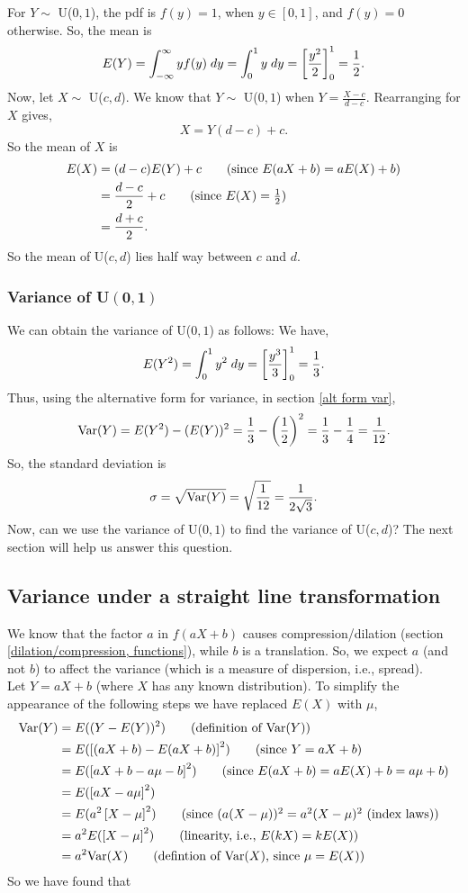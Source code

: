 \noindent For $Y \sim$ U($0,1$), the pdf is $f(y) = 1$, when $y \in [0,1]$, and $f(y) = 0$ otherwise. So, the mean is
\[
E(Y) = \int_{-\infty}^\infty yf(y) \; dy = \int_{0}^1 y \; dy = \left[\frac{y^2}{2}\right]^1_0 = \frac{1}{2}.
\]
\noindent Now, let $X \sim$ U($c,d$). We know that $Y \sim$ U($0,1$) when $Y = \frac{X-c}{d-c}$. Rearranging for $X$ gives,
\[
X = Y(d-c) + c.
\]
So the mean of $X$ is
\begin{align*}
E(X)  & = (d-c)E(Y) + c \tag{since $E(aX+b) = aE(X) + b$} \\
	& = \frac{d-c}{2} + c \tag{since $E(X) = \frac{1}{2}$} \\
	& = \frac{d+c}{2}.
\end{align*}
So the mean of U($c,d$) lies half way between $c$ and $d$. \\

\subsubsection{Variance of U$\boldsymbol{(0,1)}$} \label{variance of U(0,1)}

We can obtain the variance of U($0,1$) as follows: We have,
\[
E(Y^2) = \int_{0}^1 y^2 \; dy = \left[\frac{y^3}{3}\right]^1_0 = \frac{1}{3}.
\]
Thus, using the alternative form for variance, in section \ref{alt form var},
\[
\text{Var}(Y) = E(Y^2) - (E(Y))^2 = \frac{1}{3} - \left(\frac{1}{2}\right)^2 = \frac{1}{3} - \frac{1}{4} = \frac{1}{12}.
\]
So, the standard deviation is
\[
\sigma = \sqrt{\text{Var}(Y)} = \sqrt{\frac{1}{12}} = \frac{1}{2\sqrt{3}}.
\]
Now, can we use the variance of U($0,1$) to find the variance of U($c,d$)? The next section will help us answer this question.

\subsection{Variance under a straight line transformation} \label{var(aX+b)}
We know that the factor $a$ in $f(aX+b)$ causes compression/dilation (section \ref{dilation/compression, functions}), while $b$ is a translation. So, we expect $a$ (and not $b$) to affect the variance (which is a measure of dispersion, i.e., spread). \\

\noindent Let $Y = aX+b$ (where $X$ has any known distribution). To simplify the appearance of the following steps we have replaced $E(X)$ with $\mu$,
\begin{align*}
\Var(Y) & = E((Y - E(Y))^2) \tag{definition of $\Var(Y)$} \\
	   & = E(\squac{(aX+b) - E(aX+b)}^2) \tag{since $Y = aX+b$} \\
	   & = E(\squac{aX+b - a\mu - b}^2) \tag{since $E(aX+b) = aE(X) + b = a\mu + b$} \\
	   & = E(\squac{aX - a\mu}^2) \\
	   & = E(a^2\squac{X - \mu}^2) \tag{since $(a(X-\mu))^2 = a^2(X-\mu)^2$ (index laws)} \\
	   & = a^2E(\squac{X-\mu}^2) \tag{linearity, i.e., $E(kX) = kE(X)$} \\
	   & = a^2\Var(X) \tag{defintion of $\Var(X)$, since $\mu = E(X)$}
\end{align*}
So we have found that

